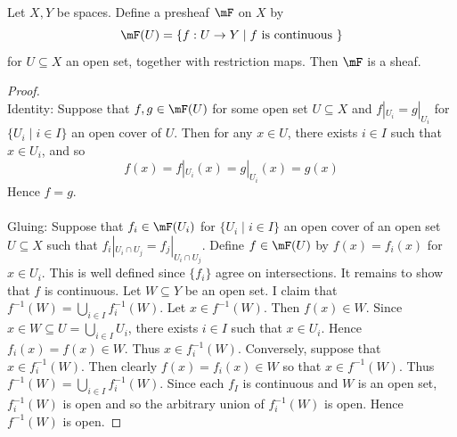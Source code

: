 \documentclass[a4paper]{article}
\begin{document}
\begin{eg}{}{}\\
Let $X,Y$ be spaces. Define a presheaf $\mF$ on $X$ by $$\mF(U)=\{f:U\to Y\;|\;f\text{ is continuous }\}$$ for $U\subseteq X$ an open set, together with restriction maps. Then $\mF$ is a sheaf. 
\begin{proof}\\
Identity: Suppose that $f,g\in\mF(U)$ for some open set $U\subseteq X$ and $f|_{U_i}=g|_{U_i}$ for $\{U_i\;|\;i\in I\}$ an open cover of $U$. Then for any $x\in U$, there exists $i\in I$ such that $x\in U_i$, and so $$f(x)=f|_{U_i}(x)=g|_{U_i}(x)=g(x)$$ Hence $f=g$. \\~\\

Gluing: Suppose that $f_i\in\mF(U_i)$ for $\{U_i\;|\;i\in I\}$ an open cover of an open set $U\subseteq X$ such that $f_i|_{U_i\cap U_j}=f_j|_{U_i\cap U_j}$. Define $f\in\mF(U)$ by $f(x)=f_i(x)$ for $x\in U_i$. This is well defined since $\{f_i\}$ agree on intersections. It remains to show that $f$ is continuous. Let $W\subseteq Y$ be an open set. I claim that $f^{-1}(W)=\bigcup_{i\in I}f_i^{-1}(W)$. Let $x\in f^{-1}(W)$. Then $f(x)\in W$. Since $x\in W\subseteq U=\bigcup_{i\in I}U_i$, there exists $i\in I$ such that $x\in U_i$. Hence $f_i(x)=f(x)\in W$. Thus $x\in f_i^{-1}(W)$. Conversely, suppose that $x\in f_i^{-1}(W)$. Then clearly $f(x)=f_i(x)\in W$ so that $x\in f^{-1}(W)$. Thus $f^{-1}(W)=\bigcup_{i\in I}f_i^{-1}(W)$. Since each $f_I$ is continuous and $W$ is an open set, $f_i^{-1}(W)$ is open and so the arbitrary union of $f_i^{-1}(W)$ is open. Hence $f^{-1}(W)$ is open. 
\end{proof}
\end{eg}
\end{document}
